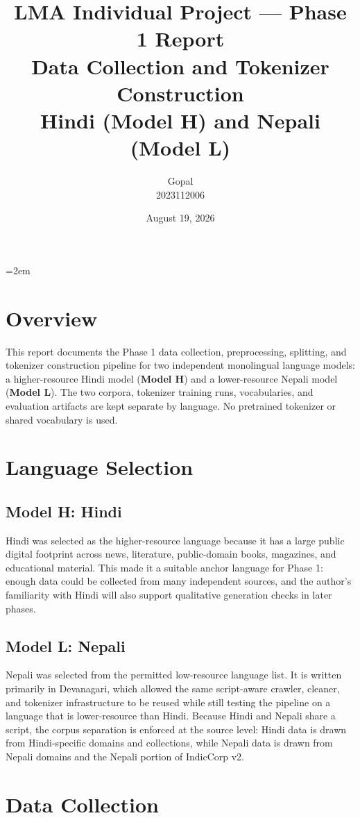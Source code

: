 \documentclass[11pt]{article}
\title{LMA Individual Project --- Phase 1 Report \\
\large Data Collection and Tokenizer Construction \\
Hindi (Model H) and Nepali (Model L)}
\author{Gopal \\ 2023112006}
\date{August 19, 2026}
\begin{document}
\emergencystretch=2em
\maketitle

\section{Overview}
This report documents the Phase 1 data collection, preprocessing, splitting,
and tokenizer construction pipeline for two independent monolingual language
models: a higher-resource Hindi model (\textbf{Model H}) and a lower-resource
Nepali model (\textbf{Model L}). The two corpora, tokenizer training runs,
vocabularies, and evaluation artifacts are kept separate by language. No
pretrained tokenizer or shared vocabulary is used.

\section{Language Selection}

\subsection{Model H: Hindi}
Hindi was selected as the higher-resource language because it has a large
public digital footprint across news, literature, public-domain books,
magazines, and educational material. This made it a suitable anchor language
for Phase 1: enough data could be collected from many independent sources,
and the author's familiarity with Hindi will also support qualitative
generation checks in later phases.

\subsection{Model L: Nepali}
Nepali was selected from the permitted low-resource language list. It is
written primarily in Devanagari, which allowed the same script-aware crawler,
cleaner, and tokenizer infrastructure to be reused while still testing the
pipeline on a language that is lower-resource than Hindi. Because Hindi and
Nepali share a script, the corpus separation is enforced at the source level:
Hindi data is drawn from Hindi-specific domains and collections, while Nepali
data is drawn from Nepali domains and the Nepali portion of IndicCorp v2.

\section{Data Collection}
\end{document}

